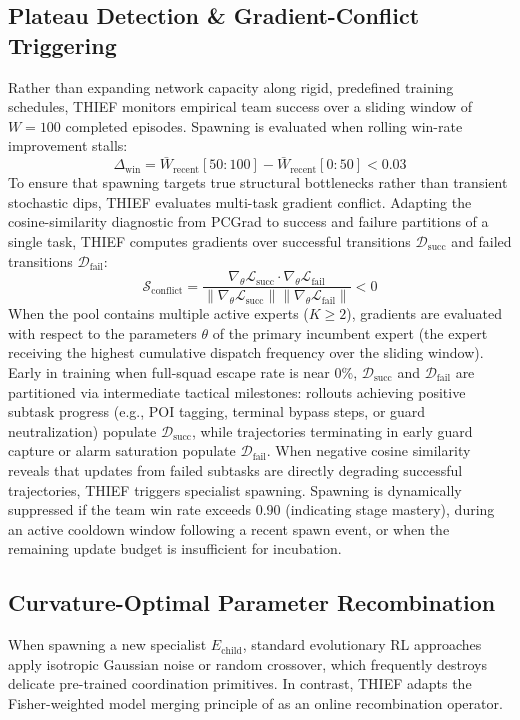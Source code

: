 \subsection{Plateau Detection \& Gradient-Conflict Triggering}
Rather than expanding network capacity along rigid, predefined training schedules, THIEF monitors empirical team success over a sliding window of $W = 100$ completed episodes. Spawning is evaluated when rolling win-rate improvement stalls:
\begin{equation}
\Delta_{\text{win}} = \bar{W}_{\text{recent}}[50:100] - \bar{W}_{\text{recent}}[0:50] < 0.03
\end{equation}
To ensure that spawning targets true structural bottlenecks rather than transient stochastic dips, THIEF evaluates multi-task gradient conflict. Adapting the cosine-similarity diagnostic from PCGrad \citep{yu2020gradient} to success and failure partitions of a single task, THIEF computes gradients over successful transitions $\mathcal{D}_{\text{succ}}$ and failed transitions $\mathcal{D}_{\text{fail}}$:
\begin{equation}
\mathcal{S}_{\text{conflict}} = \frac{\nabla_\theta \mathcal{L}_{\text{succ}} \cdot \nabla_\theta \mathcal{L}_{\text{fail}}}{\|\nabla_\theta \mathcal{L}_{\text{succ}}\| \|\nabla_\theta \mathcal{L}_{\text{fail}}\|} < 0
\end{equation}
When the pool contains multiple active experts ($K \ge 2$), gradients are evaluated with respect to the parameters $\theta$ of the primary incumbent expert (the expert receiving the highest cumulative dispatch frequency over the sliding window). Early in training when full-squad escape rate is near $0\%$, $\mathcal{D}_{\text{succ}}$ and $\mathcal{D}_{\text{fail}}$ are partitioned via intermediate tactical milestones: rollouts achieving positive subtask progress (e.g., POI tagging, terminal bypass steps, or guard neutralization) populate $\mathcal{D}_{\text{succ}}$, while trajectories terminating in early guard capture or alarm saturation populate $\mathcal{D}_{\text{fail}}$. When negative cosine similarity reveals that updates from failed subtasks are directly degrading successful trajectories, THIEF triggers specialist spawning. Spawning is dynamically suppressed if the team win rate exceeds $0.90$ (indicating stage mastery), during an active cooldown window following a recent spawn event, or when the remaining update budget is insufficient for incubation.

\subsection{Curvature-Optimal Parameter Recombination}
When spawning a new specialist $E_{\text{child}}$, standard evolutionary RL approaches apply isotropic Gaussian noise or random crossover, which frequently destroys delicate pre-trained coordination primitives. In contrast, THIEF adapts the Fisher-weighted model merging principle of \citet{matena2021merging} as an online recombination operator.

